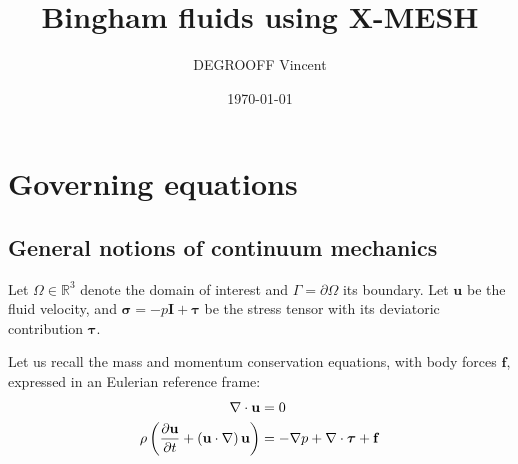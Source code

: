 \documentclass[11 pt]{report}
\title{Bingham fluids using X-MESH} %
\author{\textsc{DEGROOFF} Vincent}
\date{\today}
\begin{document}
 
\maketitle

\tableofcontents

\chapter{Governing equations}

\section{General notions of continuum mechanics}
Let $\Omega \in \mathbb{R}^3$ denote the domain of interest and $\Gamma=\partial \Omega$ its boundary. Let $\mathbf{u}$ be the fluid velocity, and $\boldsymbol{\sigma}=-p\mathbf{I}+\boldsymbol{\tau}$ be the stress tensor with its deviatoric contribution $\boldsymbol\tau$.

Let us recall the mass and momentum conservation equations, with body forces $\mathbf{f}$, expressed in an Eulerian reference frame:
\begin{align}
    \nabla \cdot \mathbf{u} &= 0\\
    \rho \left(\pdv{\mathbf{u}}{t} + \left(\mathbf{u} \cdot \nabla\right) \mathbf{u}\right) &= -\nabla p + \nabla \cdot \boldsymbol\tau + \mathbf{f}
\end{align}

\end{document}
